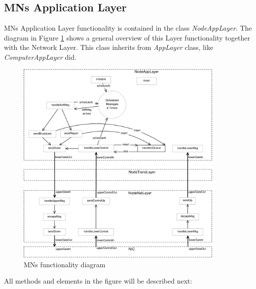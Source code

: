\subsection{\acp{MN} Application Layer}

\acp{MN} Application Layer functionality is contained in the class \textit{NodeAppLayer}. The diagram in Figure \ref{fig:MNschema} 
shows a general overview of this Layer functionality together with the Network Layer. This class inherits from \textit{AppLayer} class, like
\textit{ComputerAppLayer} did.

\begin{figure}[ht]
 \begin{center}
  \includegraphics[width=0.9\textwidth]{MNschema.eps}
 \end{center}
 \caption{\acp{MN} functionality diagram}
 \label{fig:MNschema}
\end{figure}

All methods and elements in the figure will be described next:

